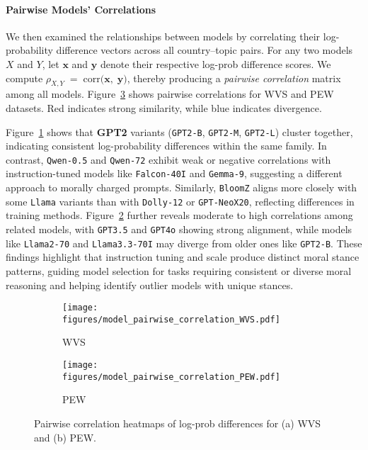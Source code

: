 \documentclass[11pt]{article}
\begin{document}
\paragraph{Pairwise Models' Correlations}We then examined the relationships between models by correlating their log-probability difference vectors across all country--topic pairs. For any two models \(X\) and \(Y\), let \(\mathbf{x}\) and \(\mathbf{y}\) denote their respective log-prob difference scores. We compute $\rho_{X,Y} \;=\; \mathrm{corr} \bigl(\mathbf{x},\;\mathbf{y}\bigr)$, thereby producing a \textit{pairwise correlation} matrix among all models.  Figure~\ref{fig:pairwise} shows pairwise correlations for WVS and PEW datasets. Red indicates strong similarity, while blue indicates divergence. 

Figure~\ref{fig:pairwise_wvs} shows that \textbf{GPT2} variants (\texttt{GPT2-B}, \texttt{GPT2-M}, \texttt{GPT2-L}) cluster together, indicating consistent log-probability differences within the same family. In contrast, \texttt{Qwen-0.5} and \texttt{Qwen-72} exhibit weak or negative correlations with instruction-tuned models like \texttt{Falcon-40I} and \texttt{Gemma-9}, suggesting a different approach to morally charged prompts. Similarly, \texttt{BloomZ} aligns more closely with some \texttt{Llama} variants than with \texttt{Dolly-12} or \texttt{GPT-NeoX20}, reflecting differences in training methods. Figure~\ref{fig:pairwise_pew} further reveals moderate to high correlations among related models, with \texttt{GPT3.5} and \texttt{GPT4o} showing strong alignment, while models like \texttt{Llama2-70} and \texttt{Llama3.3-70I} may diverge from older ones like \texttt{GPT2-B}. These findings highlight that instruction tuning and scale produce distinct moral stance patterns, guiding model selection for tasks requiring consistent or diverse moral reasoning and helping identify outlier models with unique stances.

\begin{figure}[H]
    \centering
    \begin{subfigure}{0.4\textwidth}
        \centering
        \texttt{[image: figures/model\_pairwise\_correlation\_WVS.pdf]}
        \caption{WVS}
        \label{fig:pairwise_wvs}
    \end{subfigure}
    \hspace{10pt}
    \begin{subfigure}{0.4\textwidth}
        \centering
        \texttt{[image: figures/model\_pairwise\_correlation\_PEW.pdf]}
        \caption{PEW}
        \label{fig:pairwise_pew}
    \end{subfigure}
    \vspace{-5pt}
    \caption{\small Pairwise correlation heatmaps of log-prob differences for (a) WVS and (b) PEW.}
    \label{fig:pairwise}
\end{figure}
\end{document}
